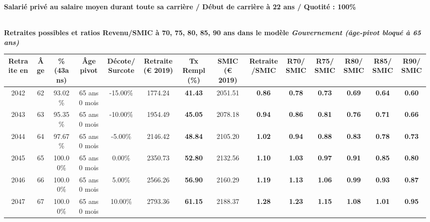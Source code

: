 {\bf \noindent Salarié privé au salaire moyen durant toute sa carrière / Début de carrière à 22 ans / Quotité : 100\%}  ~ 

 ~\\{\bf \noindent Retraites possibles et ratios Revenu/SMIC à 70, 75, 80, 85, 90 ans dans le modèle \emph{Gouvernement (âge-pivot bloqué à 65 ans)}}  
 
\begin{adjustbox}{max width=\textwidth} 
\begin{tabular}[htb]{|c|c||c|c|c||c|c||c|c||c|c|c|c|c|} 
\hline 
 Retraite en &  Âge &  \%(43ans) &  Âge pivot &  Décote/Surcote &  Retraite (\euro{} 2019) &  Tx Rempl(\%) &  SMIC (\euro{} 2019) &  Retraite/SMIC &  R70/SMIC &  R75/SMIC &  R80/SMIC &  R85/SMIC &  R90/SMIC \\ 
\hline \hline 
 2042 &  62 &  93.02\% &  65 ans 0 mois &  -15.00\% &  1774.24 &  {\bf 41.43} &  2051.51 &  {\bf {\color{red} 0.86}} &  {\bf {\color{red} 0.78}} &  {\bf {\color{red} 0.73}} &  {\bf {\color{red} 0.69}} &  {\bf {\color{red} 0.64}} &  {\bf {\color{red} 0.60}} \\ 
\hline 
 2043 &  63 &  95.35\% &  65 ans 0 mois &  -10.00\% &  1954.49 &  {\bf 45.05} &  2078.18 &  {\bf {\color{red} 0.94}} &  {\bf {\color{red} 0.86}} &  {\bf {\color{red} 0.81}} &  {\bf {\color{red} 0.76}} &  {\bf {\color{red} 0.71}} &  {\bf {\color{red} 0.66}} \\ 
\hline 
 2044 &  64 &  97.67\% &  65 ans 0 mois &  -5.00\% &  2146.42 &  {\bf 48.84} &  2105.20 &  {\bf 1.02} &  {\bf {\color{red} 0.94}} &  {\bf {\color{red} 0.88}} &  {\bf {\color{red} 0.83}} &  {\bf {\color{red} 0.78}} &  {\bf {\color{red} 0.73}} \\ 
\hline 
 2045 &  65 &  100.00\% &  65 ans 0 mois &  0.00\% &  2350.73 &  {\bf 52.80} &  2132.56 &  {\bf 1.10} &  {\bf 1.03} &  {\bf {\color{red} 0.97}} &  {\bf {\color{red} 0.91}} &  {\bf {\color{red} 0.85}} &  {\bf {\color{red} 0.80}} \\ 
\hline 
 2046 &  66 &  100.00\% &  65 ans 0 mois &  5.00\% &  2566.26 &  {\bf 56.90} &  2160.29 &  {\bf 1.19} &  {\bf 1.13} &  {\bf 1.06} &  {\bf {\color{red} 0.99}} &  {\bf {\color{red} 0.93}} &  {\bf {\color{red} 0.87}} \\ 
\hline 
 2047 &  67 &  100.00\% &  65 ans 0 mois &  10.00\% &  2793.36 &  {\bf 61.15} &  2188.37 &  {\bf 1.28} &  {\bf 1.23} &  {\bf 1.15} &  {\bf 1.08} &  {\bf 1.01} &  {\bf {\color{red} 0.95}} \\ 
\hline 
\hline 
\end{tabular} 
\end{adjustbox} 
 
